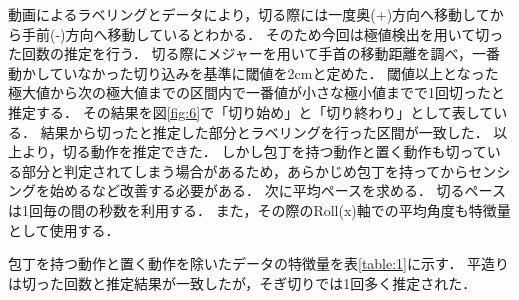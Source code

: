 
動画によるラベリングとデータにより，切る際には一度奥(+)方向へ移動してから手前(-)方向へ移動しているとわかる．
そのため今回は極値検出を用いて切った回数の推定を行う．
切る際にメジャーを用いて手首の移動距離を調べ，一番動かしていなかった切り込みを基準に閾値を2cmと定めた．
閾値以上となった極大値から次の極大値までの区間内で一番値が小さな極小値までで1回切ったと推定する．
その結果を図\ref{fig:6}で「切り始め」と「切り終わり」として表している．
結果から切ったと推定した部分とラベリングを行った区間が一致した．
以上より，切る動作を推定できた．
しかし包丁を持つ動作と置く動作も切っている部分と判定されてしまう場合があるため，あらかじめ包丁を持ってからセンシングを始めるなど改善する必要がある．
次に平均ペースを求める．
切るペースは1回毎の間の秒数を利用する．
また，その際のRoll(x)軸での平均角度も特徴量として使用する．

包丁を持つ動作と置く動作を除いたデータの特徴量を表\ref{table:1}に示す．
平造りは切った回数と推定結果が一致したが，そぎ切りでは1回多く推定された．


\begin{table}[ht]
    \centering
    \caption{各手法における特徴量}
    \label{table:1}
\end{table}


